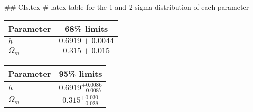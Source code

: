 ## CIs.tex
# latex table for the 1 and 2 sigma distribution of each parameter

\begin{tabular} { l  c}
 Parameter &  68\% limits\\
\hline
{\boldmath$h              $} & $0.6919\pm 0.0044          $\\
{\boldmath$\Omega_m       $} & $0.315\pm 0.015            $\\
\hline
\end{tabular}

\begin{tabular} { l  c}
 Parameter &  95\% limits\\
\hline
{\boldmath$h              $} & $0.6919^{+0.0086}_{-0.0087}$\\
{\boldmath$\Omega_m       $} & $0.315^{+0.030}_{-0.028}   $\\
\hline
\end{tabular}
